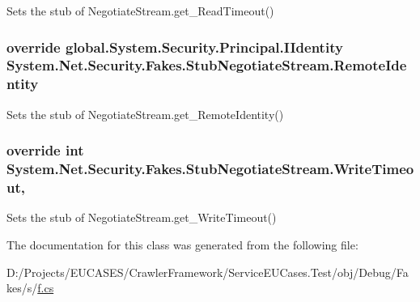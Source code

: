 Sets the stub of Negotiate\-Stream.\-get\-\_\-\-Read\-Timeout()

\hypertarget{class_system_1_1_net_1_1_security_1_1_fakes_1_1_stub_negotiate_stream_a056a1180900d06b9e562c6139cb9a200}{
\subsubsection[{Remote\-Identity}]{\setlength{\rightskip}{0pt plus 5cm}override global.\-System.\-Security.\-Principal.\-I\-Identity System.\-Net.\-Security.\-Fakes.\-Stub\-Negotiate\-Stream.\-Remote\-Identity\hspace{0.3cm}{\ttfamily [get]}}}\label{class_system_1_1_net_1_1_security_1_1_fakes_1_1_stub_negotiate_stream_a056a1180900d06b9e562c6139cb9a200}


Sets the stub of Negotiate\-Stream.\-get\-\_\-\-Remote\-Identity()

\hypertarget{class_system_1_1_net_1_1_security_1_1_fakes_1_1_stub_negotiate_stream_aa053203616fa3e3aeeca63edccdef3cb}{
\subsubsection[{Write\-Timeout}]{\setlength{\rightskip}{0pt plus 5cm}override int System.\-Net.\-Security.\-Fakes.\-Stub\-Negotiate\-Stream.\-Write\-Timeout\hspace{0.3cm}{\ttfamily [get]}, {\ttfamily [set]}}}\label{class_system_1_1_net_1_1_security_1_1_fakes_1_1_stub_negotiate_stream_aa053203616fa3e3aeeca63edccdef3cb}


Sets the stub of Negotiate\-Stream.\-get\-\_\-\-Write\-Timeout()



The documentation for this class was generated from the following file\-:\begin{DoxyCompactItemize}
\item 
D\-:/\-Projects/\-E\-U\-C\-A\-S\-E\-S/\-Crawler\-Framework/\-Service\-E\-U\-Cases.\-Test/obj/\-Debug/\-Fakes/s/\hyperlink{s_2f_8cs}{f.\-cs}\end{DoxyCompactItemize}
